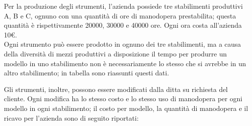 Per la produzione degli strumenti, l'azienda possiede tre stabilimenti produttivi A, B e C, ognuno con una quantità di ore di manodopera prestabilita; questa quantità è rispettivamente 20000, 30000 e 40000 ore. Ogni ora costa all'azienda 10\euro . \\
Ogni strumento può essere prodotto in ognuno dei tre stabilimenti, ma a causa della diversità di mezzi produttivi a disposizione il tempo per produrre un modello in uno stabilimento non è necessariamente lo stesso che si avrebbe in un altro stabilimento; in tabella sono riassunti questi dati.

\begin{table}[htbp]
\begin{center}
\end{center}
\end{table}

Gli strumenti, inoltre, possono essere modificati dalla ditta su richiesta del cliente. Ogni modifica ha lo stesso costo e lo stesso uso di manodopera per ogni modello in ogni stabilimento; il costo per modello, la quantità di manodopera e il ricavo per l'azienda sono di seguito riportati:

